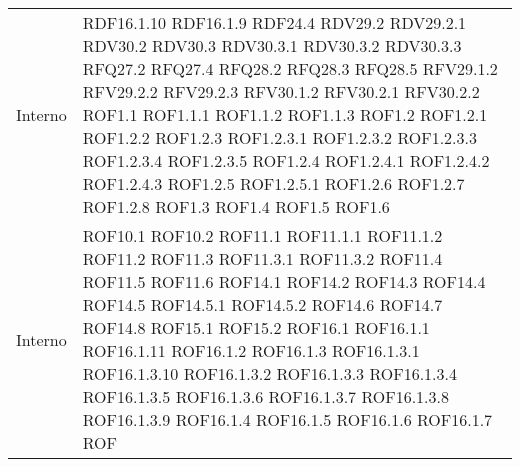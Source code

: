 \begin{longtable}{p{2.5cm}!{\VRule[1pt]}p{2.5cm}}
	Interno & RDF16.1.10 \newline RDF16.1.9 \newline RDF24.4 \newline RDV29.2 \newline RDV29.2.1 \newline RDV30.2 \newline RDV30.3 \newline RDV30.3.1 \newline RDV30.3.2 \newline RDV30.3.3 \newline RFQ27.2 \newline RFQ27.4 \newline RFQ28.2 \newline RFQ28.3 \newline RFQ28.5 \newline RFV29.1.2 \newline RFV29.2.2 \newline RFV29.2.3 \newline RFV30.1.2 \newline RFV30.2.1 \newline RFV30.2.2 \newline ROF1.1 \newline ROF1.1.1 \newline ROF1.1.2 \newline ROF1.1.3 \newline ROF1.2 \newline ROF1.2.1 \newline ROF1.2.2 \newline ROF1.2.3 \newline ROF1.2.3.1 \newline ROF1.2.3.2 \newline ROF1.2.3.3 \newline ROF1.2.3.4 \newline ROF1.2.3.5 \newline ROF1.2.4 \newline ROF1.2.4.1 \newline ROF1.2.4.2 \newline ROF1.2.4.3 \newline ROF1.2.5 \newline ROF1.2.5.1 \newline ROF1.2.6 \newline ROF1.2.7 \newline ROF1.2.8 \newline ROF1.3 \newline ROF1.4 \newline ROF1.5 \newline ROF1.6 \\ Interno & ROF10.1 \newline ROF10.2 \newline ROF11.1 \newline ROF11.1.1 \newline ROF11.1.2 \newline ROF11.2 \newline ROF11.3 \newline ROF11.3.1 \newline ROF11.3.2 \newline ROF11.4 \newline ROF11.5 \newline ROF11.6 \newline ROF14.1 \newline ROF14.2 \newline ROF14.3 \newline ROF14.4 \newline ROF14.5 \newline ROF14.5.1 \newline ROF14.5.2 \newline ROF14.6 \newline ROF14.7 \newline ROF14.8 \newline ROF15.1 \newline ROF15.2 \newline ROF16.1 \newline ROF16.1.1 \newline ROF16.1.11 \newline ROF16.1.2 \newline ROF16.1.3 \newline ROF16.1.3.1 \newline ROF16.1.3.10 \newline ROF16.1.3.2 \newline ROF16.1.3.3 \newline ROF16.1.3.4 \newline ROF16.1.3.5 \newline ROF16.1.3.6 \newline ROF16.1.3.7 \newline ROF16.1.3.8 \newline ROF16.1.3.9 \newline ROF16.1.4 \newline ROF16.1.5 \newline ROF16.1.6 \newline ROF16.1.7 \newline ROF
\end{longtable}
